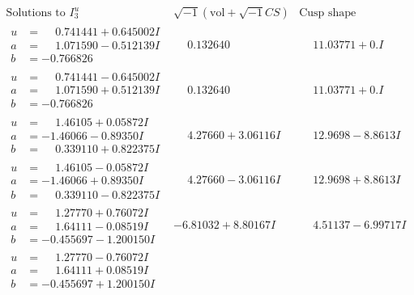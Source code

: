 \documentclass[1p]{elsarticle_modified}
\theoremstyle{definition}
\newcommand{\I}{\sqrt{-1}}
\begin{document}
$$\begin{array}{c|c|c}  
\text{Solutions to }I^u_{3}& \I (\text{vol} + \sqrt{-1}CS) & \text{Cusp shape}\\
 \hline 
\begin{aligned}
u &= \phantom{-}0.741441 + 0.645002 I \\
a &= \phantom{-}1.071590 - 0.512139 I \\
b &= -0.766826\phantom{ +0.000000I}\end{aligned}
 & \phantom{-}0.132640\phantom{ +0.000000I} & \phantom{-}11.03771 + 0. I\phantom{ +0.000000I} \\ \hline\begin{aligned}
u &= \phantom{-}0.741441 - 0.645002 I \\
a &= \phantom{-}1.071590 + 0.512139 I \\
b &= -0.766826\phantom{ +0.000000I}\end{aligned}
 & \phantom{-}0.132640\phantom{ +0.000000I} & \phantom{-}11.03771 + 0. I\phantom{ +0.000000I} \\ \hline\begin{aligned}
u &= \phantom{-}1.46105 + 0.05872 I \\
a &= -1.46066 - 0.89350 I \\
b &= \phantom{-}0.339110 + 0.822375 I\end{aligned}
 & \phantom{-}4.27660 + 3.06116 I & \phantom{-}12.9698 - 8.8613 I \\ \hline\begin{aligned}
u &= \phantom{-}1.46105 - 0.05872 I \\
a &= -1.46066 + 0.89350 I \\
b &= \phantom{-}0.339110 - 0.822375 I\end{aligned}
 & \phantom{-}4.27660 - 3.06116 I & \phantom{-}12.9698 + 8.8613 I \\ \hline\begin{aligned}
u &= \phantom{-}1.27770 + 0.76072 I \\
a &= \phantom{-}1.64111 - 0.08519 I \\
b &= -0.455697 - 1.200150 I\end{aligned}
 & -6.81032 + 8.80167 I & \phantom{-}4.51137 - 6.99717 I \\ \hline\begin{aligned}
u &= \phantom{-}1.27770 - 0.76072 I \\
a &= \phantom{-}1.64111 + 0.08519 I \\
b &= -0.455697 + 1.200150 I\end{aligned}

\end{array}$$
\end{document}
